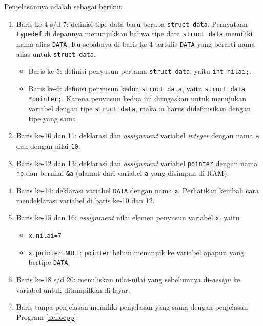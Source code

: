 Penjelasannya adalah sebagai berikut.
\begin{enumerate}
\item Baris ke-4 s/d 7: definisi tipe data baru berupa \texttt{struct data}. Pernyataan \texttt{typedef} di depannya menunjukkan bahwa tipe data \texttt{struct data} memiliki nama alias \texttt{DATA}. Itu sebabnya di baris ke-4 tertulis \texttt{DATA} yang berarti nama alias untuk \texttt{struct data}.
\begin{itemize}
\item Baris ke-5: definisi penyusun pertama \texttt{struct data}, yaitu \texttt{int nilai;}.
\item Baris ke-6: definisi penyusun kedua \texttt{struct data}, yaitu \texttt{struct data *pointer;}. Karena penyusun kedua ini ditugaskan untuk menujukan variabel dengan tipe \texttt{struct data}, maka ia harus didefinisikan dengan tipe yang sama.
\end{itemize}
\item Baris ke-10 dan 11: deklarasi dan \textit{assignment} variabel \textit{integer} dengan nama \texttt{a} dan dengan nilai \texttt{10}.
\item Baris ke-12 dan 13: deklarasi dan \textit{assignment} variabel \texttt{pointer} dengan nama \texttt{*p} dan bernilai \texttt{\&a} (alamat dari variabel \texttt{a} yang disimpan di RAM). 
\item Baris ke-14: deklarasi variabel \texttt{DATA} dengan nama \texttt{x}. Perhatikan kembali cara mendeklarasi variabel di baris ke-10 dan 12.
\item Baris ke-15 dan 16: \textit{assignment} nilai elemen penyusun variabel \texttt{x}, yaitu
\begin{itemize}
\item \texttt{x.nilai=7}
\item \texttt{x.pointer=NULL}: \texttt{pointer} belum menunjuk ke variabel apapun yang bertipe \texttt{DATA}.
\end{itemize}
\item Baris ke-18 s/d 20: menuliskan nilai-nilai yang sebelumnya di-\textit{assign} ke variabel untuk ditampilkan di layar.
\item Baris tanpa penjelasan memiliki penjelasan yang sama dengan penjelasan Program \ref{hellocpp}.
\end{enumerate}




